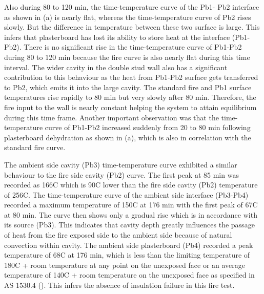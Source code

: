 Also during 80 to 120 min, the time-temperature curve of the Pb1- Pb2 interface as shown in  (a) is nearly flat, whereas the time-temperature curve of Pb2 rises slowly. But the difference in temperature between these two surface is large. This infers that plasterboard has lost its ability to store heat at the interface (Pb1-Pb2). There is no significant rise in the time-temperature curve of Pb1-Pb2 during 80 to 120 min because the fire curve is also nearly flat during this time interval. The wider cavity in the double stud wall also has a significant contribution to this behaviour as the heat from Pb1-Pb2 surface gets transferred to Pb2, which emits it into the large cavity. The standard fire and Pb1 surface temperatures rise rapidly to 80 min but very slowly after 80 min. Therefore, the fire input to the wall is nearly constant helping the system to attain equilibrium during this time frame. Another important observation was that the time-temperature curve of Pb1-Pb2 increased suddenly from 20 to 80 min following plasterboard dehydration as shown in  (a), which is also in correlation with the standard fire curve.

The ambient side cavity (Pb3) time-temperature curve exhibited a similar behaviour to the fire side cavity (Pb2) curve. The first peak at 85 min was recorded as 166\degree C which is 90\degree C lower than the fire side cavity (Pb2) temperature of 256\degree C. The time-temperature curve of the ambient side interface (Pb3-Pb4) recorded a maximum temperature of 150\degree C at 176 min with the first peak of 67\degree C at 80 min. The curve then shows only a gradual rise which is in accordance with its source (Pb3). This indicates that cavity depth greatly influences the passage of heat from the fire exposed side to the ambient side because of natural convection within cavity. The ambient side plasterboard (Pb4) recorded a peak temperature of 68\degree C at 176 min, which is less than the limiting temperature of 180\degree C + room temperature at any point on the unexposed face or an average temperature of 140\degree C + room temperature on the unexposed face as specified in AS 1530.4 (\cite{StandardsAustral2014}). This infers the absence of insulation failure in this fire test.

